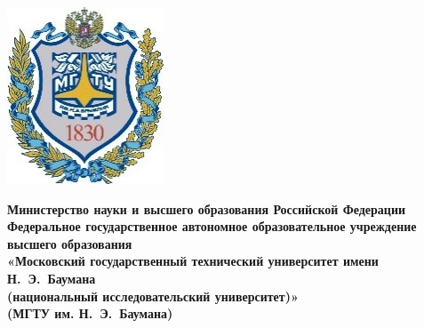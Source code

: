 \newcommand{\fixunderline}[3]
{
	$\underset{\text{#3}}{\text{\uline{\stackengine{0pt}{\hspace{#2}}{\text{#1}}{O}{c}{F}{F}{L}}}}$
}

\begin{titlepage}
	\fontsize{12pt}{12pt}\selectfont
	\noindent \begin{minipage}{0.15\textwidth}
		\includegraphics[width=\linewidth]{tools/img/title_img.jpg}
	\end{minipage}
	\noindent\begin{minipage}{0.9\textwidth}\centering
		\textbf{Министерство науки и высшего образования Российской Федерации}\\
		\textbf{Федеральное государственное автономное образовательное учреждение высшего образования}\\
		\textbf{«Московский государственный технический университет имени Н.~Э.~Баумана}\\
		\textbf{(национальный исследовательский университет)»}\\
		\textbf{(МГТУ им. Н.~Э.~Баумана)}
	\end{minipage}


\end{titlepage}
